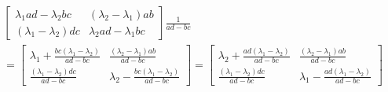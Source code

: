 \documentclass[11pt, titlepage, a4paper]{article}
\begin{document}
\begin{observation}
\begin{align*}
\begin{bmatrix}
 \lambda_{1}ad - \lambda_{2}bc & (\lambda_{2}-\lambda_{1})ab \\
  (\lambda_{1}-\lambda_{2})dc & \lambda_{2}ad - \lambda_{1}bc
\end{bmatrix} \frac{1}{ad-bc} \\ = 
\begin{bmatrix}
 \lambda_{1} + \frac{bc(\lambda_{1}-\lambda_{2})}{ad-bc} & \frac{(\lambda_{2}-\lambda_{1})ab}{ad-bc}\\
 \frac{(\lambda_{1}-\lambda_{2})dc}{ad-bc}&  \lambda_{2} - \frac{bc(\lambda_{1}-\lambda_{2})}{ad-bc}
\end{bmatrix} = \begin{bmatrix}
 \lambda_{2} + \frac{ad(\lambda_{1}-\lambda_{2})}{ad-bc} & \frac{(\lambda_{2}-\lambda_{1})ab}{ad-bc}\\
 \frac{(\lambda_{1}-\lambda_{2})dc}{ad-bc}&  \lambda_{1} - \frac{ad(\lambda_{1}-\lambda_{2})}{ad-bc}
\end{bmatrix}
\end{align*}
\end{observation}
 
\end{document}
